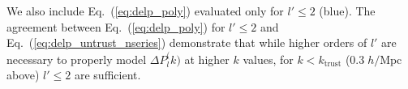 \begin{figure*}
\begin{center}
{                                                                                                                                                                                                                                                                            We also include Eq.~(\ref{eq:delp_poly}) evaluated only for $l' \leq 2$ (blue). 
                                                                                                                                                                                                                                                                            The agreement between Eq.~(\ref{eq:delp_poly}) for $l' \leq 2$ and Eq.~(\ref{eq:delp_untrust_nseries}) demonstrate that while higher orders of $l'$ are 
                                                                                                                                                                                                                                                                            necessary to properly model $\Delta P_l^\mathrm(k)$ at higher $k$ values, 
                                                                                                                                                                                                                                                                            for $k < k_\mathrm{trust}$ ($0.3\;h/\mathrm{Mpc}$ above) $l' \leq 2 $ are 
                                                                                                                                                                                                                                                                            sufficient.}
                                                                                                                                                                                                                                                                            \label{fig:delP_untrust}
                                                                                                                                                                                                                                                                            \end{center}
                                                                                                                                                                                                                                                                            \end{figure*}


